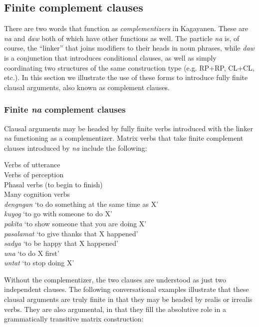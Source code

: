 \subsection{Finite complement clauses}

There are two words that function as \textit{complementizers} in Kagayanen. These are \textit{na} and \textit{daw} both of which have other functions as well. The particle \textit{na} is, of course, the “linker” that joins modifiers to their heads in noun phrases, while \textit{daw} is a conjunction that introduces conditional clauses, as well as simply coordinating two structures of the same construction type (e.g. RP+RP, CL+CL, etc.). In this section we illustrate the use of these forms to introduce fully finite clausal arguments, also known as complement clauses.


\subsubsection{Finite \textit{na} complement clauses}
\label{sec:na-complementclauses}

Clausal arguments may be headed by fully finite verbs introduced with the linker \textit{na} functioning as a complementizer. Matrix verbs that take finite complement clauses introduced by \textit{na} include the following:

\ea
Verbs of utterance \\
Verbs of perception \\
Phasal verbs (to begin to finish) \\
Many cognition verbs \\
\textit{dengngan}   ‘to do something at the same time as X’ \\
\textit{kuyog}   ‘to go with someone to do X’  \\
\textit{pakita}   ‘to show someone that you are doing X’  \\
\textit{pasalamat}   ‘to give thanks that X happened’  \\
\textit{sadya}   ‘to be happy that X happened’  \\
\textit{una}   ‘to do X first’ \\
\textit{untat}   ‘to stop doing X’
\z

Without the complementizer, the two clauses are understood as just two independent clauses. The following conversational examples illustrate that these clausal arguments are truly finite in that they may be headed by realis or irrealis verbs. They are also argumental, in that they fill the absolutive role in a grammatically transitive matrix construction:

